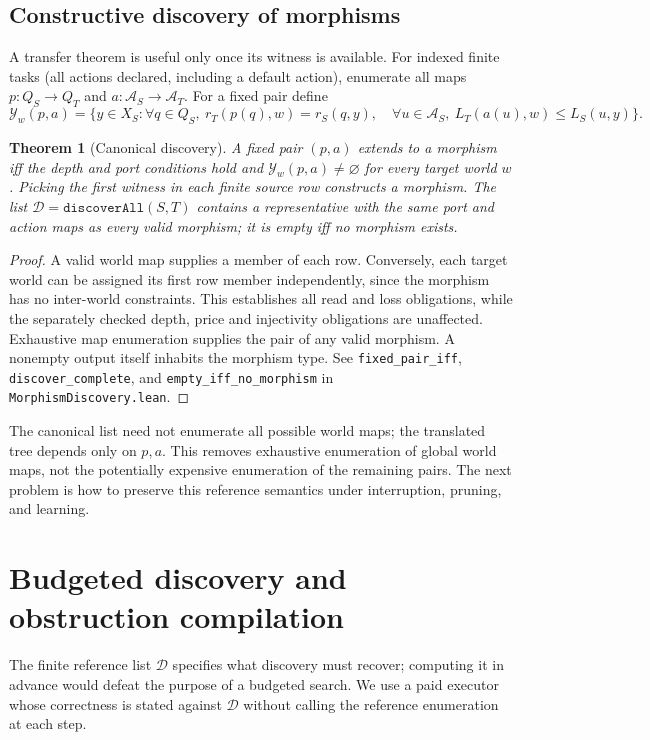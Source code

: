 \documentclass[10pt,letterpaper]{article}
\newtheorem{theorem}{Theorem}[section]
\newcommand{\CanonRef}{\mathcal D}
\newcommand{\rc}[1]{\texttt{#1}}
\begin{document}
\subsection{Constructive discovery of morphisms}
A transfer theorem is useful only once its witness is available. For indexed finite tasks (all actions declared, including a default action), enumerate all maps $p:Q_S\to Q_T$ and $a:\mathcal A_S\to\mathcal A_T$. For a fixed pair define
\[
 \mathcal Y_w(p,a)=\{y\in X_S: \forall q\in Q_S,\ r_T(p(q),w)=r_S(q,y),\quad
 \forall u\in\mathcal A_S,\ L_T(a(u),w)\le L_S(u,y)\}.
\]
\begin{theorem}[Canonical discovery]\label{thm:discovery}
A fixed pair $(p,a)$ extends to a morphism iff the depth and port conditions hold and $\mathcal Y_w(p,a)\ne\varnothing$ for every target world $w$. Picking the first witness in each finite source row constructs a morphism. The list $\CanonRef=\rc{discoverAll}(S,T)$ contains a representative with the same port and action maps as every valid morphism; it is empty iff no morphism exists.
\end{theorem}
\begin{proof}
A valid world map supplies a member of each row. Conversely, each target world can be assigned its first row member independently, since the morphism has no inter-world constraints. This establishes all read and loss obligations, while the separately checked depth, price and injectivity obligations are unaffected. Exhaustive map enumeration supplies the pair of any valid morphism. A nonempty output itself inhabits the morphism type. See \rc{fixed\_pair\_iff}, \rc{discover\_complete}, and \rc{empty\_iff\_no\_morphism} in \rc{MorphismDiscovery.lean}.
\end{proof}
The canonical list need not enumerate all possible world maps; the translated tree depends only on $p,a$. This removes exhaustive enumeration of global world maps, not the potentially expensive enumeration of the remaining pairs. The next problem is how to preserve this reference semantics under interruption, pruning, and learning.
\clearpage
\section{Budgeted discovery and obstruction compilation}\label{sec:obstruction}
The finite reference list $\CanonRef$ specifies what discovery must recover; computing it in advance would defeat the purpose of a budgeted search. We use a paid executor whose correctness is stated against $\CanonRef$ without calling the reference enumeration at each step.
\end{document}
